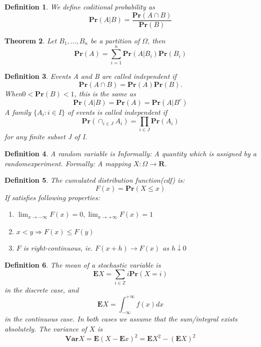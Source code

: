 \documentclass[11pt]{article}
\newcommand{\Ppb}{\mathbf{Pr}}
\newcommand{\Es}{\mathbf{E}}
\newcommand{\Var}{\mathbf{Var}}
\newcommand{\Real}{\mathbf{R}}
\newtheorem{theorem}{Theorem}
\newtheorem{definition}[theorem]{Definition}
\begin{document}
\begin{definition}
We define coditional probability as 
\begin{equation*}
    \Ppb(A | B)=\frac{\Ppb(A \cap B)}{\Ppb(B)}
\end{equation*}
\end{definition}
\begin{theorem}
Let $B_{1}, \dots, B_{n}$ be a partition of $\Omega$, then
\begin{equation}
\Ppb(A)=\sum_{i=1}^{n} \Ppb\left(A | B_{i}\right) \Ppb\left(B_{i}\right)
\end{equation}
\end{theorem}
\begin{definition}
Events A and B are called independent if
\begin{equation}
\Ppb(A \cap B)=\Ppb(A) \Ppb(B).
\end{equation}
When$ 0 < \Ppb(B) < 1$, this is the same as
\begin{equation}
\Ppb(A | B)=\Ppb(A)=\Ppb\left(A | B^{c}\right)
\end{equation}
A family $\{A_i : i \in I\}$ of events is called independent if
\begin{equation}
\Ppb\left(\cap_{i \in J} A_{i}\right)=\prod_{i \in J} \Ppb\left(A_{i}\right)
\end{equation}
for any finite subset J of I.
\end{definition}

\begin{definition}
A random variable is
Informally: A quantity which is assigned by a randomexperiment.
Formally: A mapping $X : \Omega \rightarrow \Real$.
\end{definition}
\begin{definition}
The cumulated distribution function(cdf) is:
\begin{equation}
F(x)=\Ppb(X \leq x)
\end{equation}
If satisfies following properties:
\begin{enumerate}
    \item $\lim _{x \rightarrow-\infty} F(x)=0, \lim _{x \rightarrow+\infty} F(x)=1$
    \item $x<y \Rightarrow F(x) \leq F(y)$
    \item $F$ is right-continuous, ie. $F(x+h) \rightarrow F(x)$ as $h \downarrow 0$
\end{enumerate}
\end{definition}
\begin{definition}
The mean of a stochastic variable is
$$
\Es X=\sum_{i \in \mathbb{Z}} i \Ppb(X=i)
$$
in the discrete case, and
$$
\Es X=\int_{-\infty}^{+\infty} f(x) d x
$$
in the continuous case. In both cases we assume that the
sum/integral exists absolutely.
The variance of $X$ is
$$
\Var X=\Es(X-\Es x)^{2}=\Es X^{2}-(\Es X)^{2}
$$
\end{definition}
\end{document}
